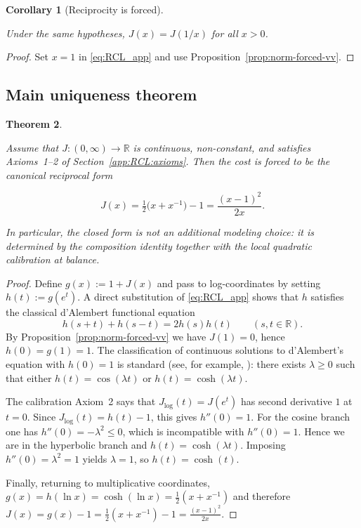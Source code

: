 \documentclass[11pt,reqno]{amsart}
\newtheorem{theorem}{Theorem}[section]
\newtheorem{corollary}[theorem]{Corollary}
\theoremstyle{definition}
\theoremstyle{remark}
\newcommand{\1}{\mathbf{1}}
\begin{document}
\begin{corollary}[Reciprocity is forced]\label{cor:recip-forced-vv}

Under the same hypotheses, $J(x)=J(1/x)$ for all $x>0$.

\end{corollary}

\begin{proof}

Set $x=1$ in \eqref{eq:RCL_app} and use Proposition~\ref{prop:norm-forced-vv}.

\end{proof}

\subsection{Main uniqueness theorem}\label{app:RCL:uniqueness}

\begin{theorem}\label{thm:RCL-unique}

Assume that $J:(0,\infty)\to\mathbb{R}$ is continuous, non-constant, and satisfies Axioms~1--2 of Section~\ref{app:RCL:axioms}. Then the cost is forced to be the canonical reciprocal form

\[
J(x)=\tfrac12\bigl(x+x^{-1}\bigr)-1=\frac{(x-1)^2}{2x}.
\]

In particular, the closed form is not an additional modeling choice: it is determined by the composition identity together with the local quadratic calibration at balance.

\end{theorem}

\begin{proof}
Define $g(x):=1+J(x)$ and pass to log-coordinates by setting $h(t):=g(e^{t})$. A direct substitution of \eqref{eq:RCL_app} shows that $h$ satisfies the classical d'Alembert functional equation
\[
h(s+t)+h(s-t)=2h(s)h(t)\qquad (s,t\in\mathbb{R}).
\]
By Proposition~\ref{prop:norm-forced-vv} we have $J(1)=0$, hence $h(0)=g(1)=1$. The classification of continuous solutions to d'Alembert's equation with $h(0)=1$ is standard (see, for example, \cite{aczel1966}): there exists $\lambda\ge 0$ such that either $h(t)=\cos(\lambda t)$ or $h(t)=\cosh(\lambda t)$.

The calibration Axiom~2 says that $J_{\log}(t)=J(e^{t})$ has second derivative $1$ at $t=0$. Since $J_{\log}(t)=h(t)-1$, this gives $h''(0)=1$. For the cosine branch one has $h''(0)=-\lambda^2\le 0$, which is incompatible with $h''(0)=1$. Hence we are in the hyperbolic branch and $h(t)=\cosh(\lambda t)$. Imposing $h''(0)=\lambda^2=1$ yields $\lambda=1$, so $h(t)=\cosh(t)$.

Finally, returning to multiplicative coordinates, $g(x)=h(\ln x)=\cosh(\ln x)=\tfrac12(x+x^{-1})$ and therefore $J(x)=g(x)-1=\tfrac12(x+x^{-1})-1=\frac{(x-1)^2}{2x}$.
\end{proof}
\end{document}
